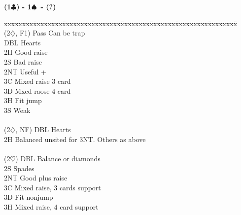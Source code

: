 \documentclass[10pt]{article}
\renewcommand{\c}{$\clubsuit$}
\renewcommand{\d}{$\diamondsuit$}
\newcommand{\h}{$\heartsuit$}
\newcommand{\s}{$\spadesuit$}
\newenvironment{bidtable}[1][]
{\textbf{#1}
  \begin{adjustwidth}{1em}{}
    \addvspace{2pt}
    \begin{tabbing}
      xxxxxxxx\=xxxxxxxx\=xxxxxxxx\=xxxxxxxx\=xxxxxxxx\=xxxxxxx\=xxxxxxxxx\=xxxxxxxx\=\kill}
{\end{tabbing}\end{adjustwidth}\bigskip}%
\begin{document}
\begin{bidtable}[(1\c) - 1\s\ - (?)]
                                                                \\
(2\d, F1) \> Pass  \> Can be trap                               \\
          \> DBL   \> Hearts                                    \\
          \> 2H    \> Good raise                                \\
          \> 2S    \> Bad raise                                 \\
          \> 2NT   \> Useful +                                  \\
          \> 3C    \> Mixed raise 3 card                        \\
          \> 3D    \> Mxed raose 4 card                         \\
          \> 3H    \> Fit jump                                  \\
          \> 3S    \> Weak                                      \\
                                                                \\
(2\d, NF) \> DBL   \> Hearts                                    \\
          \> 2H    \> Balanced unsited for 3NT. Others as above \\
                                                                \\
(2\h)     \> DBL   \> Balance or diamonds                       \\
          \> 2S    \> Spades                                    \\
          \> 2NT   \> Good plus raise                           \\
          \> 3C    \> Mixed raise, 3 cards support              \\
          \> 3D    \> Fit nonjump                               \\
          \> 3H    \> Mixed raise, 4 card support
\end{bidtable}
\end{document}
